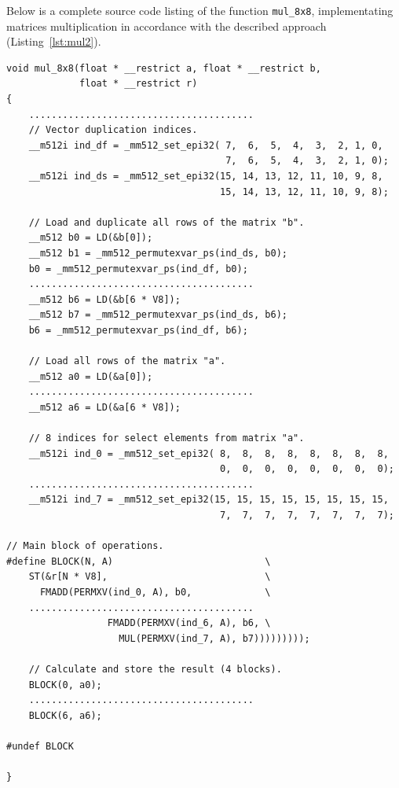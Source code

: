 \documentclass[
11pt,%
tightenlines,%
twoside,%
onecolumn,%
nofloats,%
nobibnotes,%
nofootinbib,%
superscriptaddress,%
noshowpacs,%
centertags]%
{revtex4}
\begin{document}
Below is a complete source code listing of the function \texttt{mul\_8x8}, implementating matrices multiplication in accordance with the described approach (Listing~\ref{lst:mul2}).

\begin{lstlisting}[caption={Approach to \texttt{mul\_8x8} implementation with line-by-line reading of matrixes from memory.},label={lst:mul2}]
void mul_8x8(float * __restrict a, float * __restrict b,
             float * __restrict r)
{
    ........................................
    // Vector duplication indices.
    __m512i ind_df = _mm512_set_epi32( 7,  6,  5,  4,  3,  2, 1, 0,
                                       7,  6,  5,  4,  3,  2, 1, 0);
    __m512i ind_ds = _mm512_set_epi32(15, 14, 13, 12, 11, 10, 9, 8,
                                      15, 14, 13, 12, 11, 10, 9, 8);

    // Load and duplicate all rows of the matrix "b".
    __m512 b0 = LD(&b[0]);
    __m512 b1 = _mm512_permutexvar_ps(ind_ds, b0);
    b0 = _mm512_permutexvar_ps(ind_df, b0);
    ........................................
    __m512 b6 = LD(&b[6 * V8]);
    __m512 b7 = _mm512_permutexvar_ps(ind_ds, b6);
    b6 = _mm512_permutexvar_ps(ind_df, b6);

    // Load all rows of the matrix "a".
    __m512 a0 = LD(&a[0]);
    ........................................
    __m512 a6 = LD(&a[6 * V8]);

    // 8 indices for select elements from matrix "a".
    __m512i ind_0 = _mm512_set_epi32( 8,  8,  8,  8,  8,  8,  8,  8,
                                      0,  0,  0,  0,  0,  0,  0,  0);
    ........................................
    __m512i ind_7 = _mm512_set_epi32(15, 15, 15, 15, 15, 15, 15, 15,
                                      7,  7,  7,  7,  7,  7,  7,  7);

// Main block of operations.
#define BLOCK(N, A)                           \
    ST(&r[N * V8],                            \
      FMADD(PERMXV(ind_0, A), b0,             \
    ........................................
                  FMADD(PERMXV(ind_6, A), b6, \
                    MUL(PERMXV(ind_7, A), b7)))))))));

    // Calculate and store the result (4 blocks).
    BLOCK(0, a0);
    ........................................
    BLOCK(6, a6);

#undef BLOCK

}
\end{lstlisting}
\end{document}
